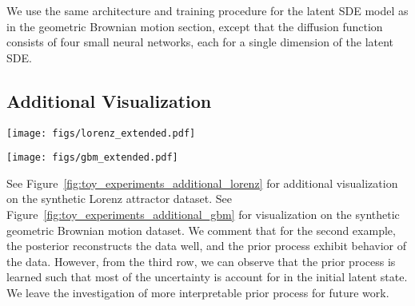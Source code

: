 \documentclass[twoside]{article}
\begin{document}
We use the same architecture and training procedure for the latent SDE model as in the geometric Brownian motion section, except that the diffusion function consists of four small neural networks, each for a single dimension of the latent SDE.
 \subsection{Additional Visualization}\label{app:visualization}

\begin{figure*}[ht]
\begin{minipage}[ht]{\linewidth}
\centering
{\texttt{[image: figs/lorenz\_extended.pdf]}} \\ \vspace{-0.10cm}
\end{minipage}
\caption{
Additional visualizations of learned posterior and prior dynamics on the synthetic stochastic Lorenz attractor dataset.
First row displays the true data and posterior reconstructions. 
Second row displays samples with initial latent state for each trajectory is sampled independently. 
Third row displays samples with initial latent state sampled and fixed to be the same for different trajectories. 
}
\label{fig:toy_experiments_additional_lorenz}
\end{figure*}

\begin{figure*}[ht]
\begin{minipage}[ht]{\linewidth}
\centering
{\texttt{[image: figs/gbm\_extended.pdf]}} \\ \vspace{-0.10cm}
\end{minipage}
\caption{
Visualizations of learned posterior and prior dynamics on the synthetic geometric Brownian motion dataset.
First row displays the true data and posterior reconstructions. Orange contour covers  of 512 samples.
Second row displays samples with initial latent state for each trajectory is sampled independently. 
Third row displays samples with initial latent state sampled and fixed to be the same for different trajectories. 
}
\label{fig:toy_experiments_additional_gbm}
\end{figure*}

See Figure~\ref{fig:toy_experiments_additional_lorenz} for additional visualization on the synthetic Lorenz attractor dataset.
See Figure~\ref{fig:toy_experiments_additional_gbm} for visualization on the synthetic geometric Brownian motion dataset.
We comment that for the second example, the posterior reconstructs the data well, and the prior process exhibit behavior of the data. However, from the third row, we can observe that the prior process is learned such that most of the uncertainty is account for in the initial latent state. We leave the investigation of more interpretable prior process for future work. 
 
\end{document}
